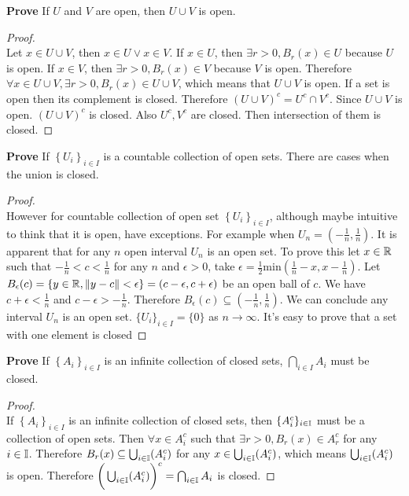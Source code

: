 \documentclass[11pt]{article}
\begin{document}
$ $\\
\textbf{Prove} If $U$ and $V$ are open, then $U\cup V$ is open.
\begin{proof}
  $ $\\
  Let $x\in U\cup V$, then $x\in U \lor x\in V$. If $x\in U$, then $\exists r > 0, B_r(x)\in U$ because $U$ is open. If $x\in V$, then $\exists r > 0, B_r(x)\in V$ because $V$ is open. Therefore $\forall x\in U\cup V, \exists r>0, B_r(x)\in U\cup V$, which means that $U\cup V$ is open. If a set is open then its complement is closed. Therefore $(U\cup V)^c = U^c \cap V^c$. Since $U\cup V$ is open. $(U\cup V)^c$ is closed. Also $U^c, V^c$ are closed. Then intersection of them is closed.
\end{proof}
$ $\\
\textbf{Prove} If $\left\{U_{i}\right\}_{i\in I}$ is a countable collection of open sets. There are cases when the union is closed.
\begin{proof}
  $ $\\
  However for countable collection of open set $\left\{U_{i}\right\}_{i\in I}$, although maybe intuitive to think that it is open, have exceptions. For example when $U_n = (-\frac{1}{n}, \frac{1}{n})$. It is apparent that for any $n$ open interval $U_n$ is an open set. To prove this let $x\in \mathbb{R}$ such that $-\frac{1}{n}<c<\frac{1}{n}$ for any $n$ and $\epsilon>0$, take $\epsilon = \frac{1}{2} \text{min}( \frac{1}{n} - x, x - \frac{1}{n} ) $. Let $B_{\epsilon}(c) = \{ y\in \mathbb{R}, \| y-c\| < \epsilon\} =(c-\epsilon, c+\epsilon)$ be an open ball of $c$. We have $c+\epsilon < \frac{1}{n}$ and $c-\epsilon > -\frac{1}{n}$. Therefore $B_{\epsilon}(c)\subseteq (-\frac{1}{n}, \frac{1}{n})$. We can conclude any interval $U_n$ is an open set. $\{U_i\}_{i\in I} = \{ 0 \}$ as $n \to \infty$. It's easy to prove that a set with one element is closed
\end{proof}
$ $\\
\textbf{Prove} If $\left\{A_{i}\right\}_{i\in I}$ is an infinite collection of closed sets, $\bigcap_{i\in I}A_i$ must be closed.

\begin{proof}
  $ $\\
  If $\left\{A_{i}\right\}_{i\in I}$ is an infinite collection of closed sets, then $\{ A_i^c\}_{i\in \mathbb{I}}$ must be a collection of open sets. Then $\forall x\in A_i^c$ such that $\exists r > 0, B_r(x) \in A_r^c$ for any $i\in\mathbb{I}$. Therefore $B_r(x)\subseteq \bigcup_{i\in\mathbb{I}}(A_i^c)$ for any $x\in \bigcup_{i\in\mathbb{I}}(A_i^c)$, which means $\bigcup_{i\in\mathbb{I}}(A_i^c)$ is open. Therefore $\bigg(\bigcup_{i\in\mathbb{I}}(A_i^c)\bigg)^c = \bigcap_{i\in \mathbb{I}}A_i$ is closed.

\end{proof}
\end{document}
